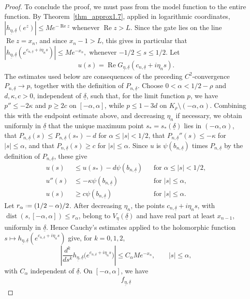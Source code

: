 \documentclass[a4paper, 11pt, reqno]{amsart}
\numberwithin{equation}{section}
\theoremstyle{plain}
\newcommand*{\defeq}{\mathrel{\vcenter{\baselineskip0.5ex \lineskiplimit0pt
 \hbox{\scriptsize.}\hbox{\scriptsize.}}}=}
\theoremstyle{remark}
\newcommand{\uldelta}{\underline{\delta}}
\newcommand{\uleta}{\underline{\eta}}
\newcommand{\Rea}{\operatorname{Re }}
\begin{document}
\begin{proof}
	To conclude the proof, we must pass from the model function to the entire
	function. By Theorem~\ref{thm_approx1.7}, applied in logarithmic
	coordinates,
	$
	|h_{\uleta,\uldelta}(e^z)|\le Me^{-\Rea z}
	$
	whenever \(\Rea z>L\). Since the gate lies on the line \(\Rea z=x_n\), and
	since \(x_n-1>L\), this gives in particular
	that $
	|h_{\uleta,\uldelta}(e^{c_{n,\uldelta}+i\eta_ns})|
	\le Me^{-x_n},$ whenever $-1/2\le s\le1/2$. Let
	\[
	u(s)=\Rea G_{\uleta,\uldelta}(c_{n,\uldelta}+i\eta_ns).
	\]
	The estimates used below are consequences of the preceding
		\(C^2\)-convergence \(P_{n,\uldelta}\to p\), together with the definition of
		\(P_{n,\uldelta}\). Choose \(0<\alpha<1/2-\rho\) and
		\(d,\kappa,c>0\), independent of \(\uldelta\), such that, for the limit
		function \(p\), we have \(p''\le -2\kappa\) and \(p\ge 2c\) on
		\([-\alpha,\alpha]\), while \(p\le1-3d\) on
		\(K_\rho\setminus(-\alpha,\alpha)\). Combining this with the endpoint
		estimate above, and decreasing \(\eta_n\) if necessary, we obtain uniformly
		in \(\uldelta\) that the unique maximum point \(s_*=s_*(\uldelta)\) lies in
		\((-\alpha,\alpha)\), that
		\(P_{n,\uldelta}(s)\le P_{n,\uldelta}(s_*)-d\) for
		\(\alpha\le |s|<1/2\), that \(P_{n,\uldelta}''(s)\le-\kappa\) for
		\(|s|\le\alpha\), and that \(P_{n,\uldelta}(s)\ge c\) for
		\(|s|\le\alpha\). Since \(u\) is \(\psi(b_{n,\uldelta})\) times
		\(P_{n,\uldelta}\) by the definition of \(P_{n,\uldelta}\), these give
		\[
			\begin{aligned}
				u(s)&\le u(s_*)-d\psi(b_{n,\uldelta})
				&&\text{for } \alpha\le |s|<1/2,\\
				u''(s)&\le -\kappa\psi(b_{n,\uldelta})
				&&\text{for } |s|\le\alpha,\\
				u(s)&\ge c\psi(b_{n,\uldelta})
				&&\text{for } |s|\le\alpha .
		\end{aligned}
		\]
	Let
	\(r_\alpha\defeq(1/2-\alpha)/2\). After decreasing $\eta_n$, the points $c_{n,\uldelta}+i\eta_ns$, with $\operatorname{dist}(s,[-\alpha,\alpha])\le r_\alpha$, belong to $V_{\uleta}(\uldelta)$ and have real part at least $x_{n-1}$, uniformly in $\uldelta$. Hence Cauchy's estimates applied to the holomorphic function
	\(s\mapsto h_{\uleta,\uldelta}(e^{c_{n,\uldelta}+i\eta_ns})\) give, for
	\(k=0,1,2\),
	\[
	\left|
	\frac{d^k}{ds^k}
	h_{\uleta,\uldelta}
	\bigl(e^{c_{n,\uldelta}+i\eta_ns}\bigr)
	\right|
	\le
	C_\alpha Me^{-x_n},
	\qquad |s|\le\alpha,
	\]
	with \(C_\alpha\) independent of \(\uldelta\). 
	On \([-\alpha,\alpha]\), we have
	\[
	\begin{aligned}
		f_{\uleta,\uldelta}

\end{aligned}\]
\end{proof}
\end{document}
